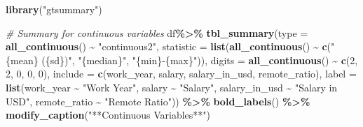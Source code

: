 \documentclass[
]{article}
\newenvironment{Shaded}{\begin{snugshade}}{\end{snugshade}}
\newcommand{\AttributeTok}[1]{\textcolor[rgb]{0.13,0.29,0.53}{#1}}
\newcommand{\CommentTok}[1]{\textcolor[rgb]{0.56,0.35,0.01}{\textit{#1}}}
\newcommand{\DecValTok}[1]{\textcolor[rgb]{0.00,0.00,0.81}{#1}}
\newcommand{\FunctionTok}[1]{\textcolor[rgb]{0.13,0.29,0.53}{\textbf{#1}}}
\newcommand{\NormalTok}[1]{#1}
\newcommand{\SpecialCharTok}[1]{\textcolor[rgb]{0.81,0.36,0.00}{\textbf{#1}}}
\newcommand{\StringTok}[1]{\textcolor[rgb]{0.31,0.60,0.02}{#1}}
\begin{document}
\begin{Shaded}
\begin{Highlighting}[]
\FunctionTok{library}\NormalTok{(}\StringTok{"gtsummary"}\NormalTok{)}

\CommentTok{\# Summary for continuous variables}
\NormalTok{df}\SpecialCharTok{\%\textgreater{}\%} 
  \FunctionTok{tbl\_summary}\NormalTok{(}\AttributeTok{type =} \FunctionTok{all\_continuous}\NormalTok{() }\SpecialCharTok{\textasciitilde{}} \StringTok{"continuous2"}\NormalTok{, }\AttributeTok{statistic =} \FunctionTok{list}\NormalTok{(}\FunctionTok{all\_continuous}\NormalTok{() }\SpecialCharTok{\textasciitilde{}} \FunctionTok{c}\NormalTok{(}\StringTok{"\{mean\} (\{sd\})"}\NormalTok{, }\StringTok{"\{median\}"}\NormalTok{, }\StringTok{"\{min\}{-}\{max\}"}\NormalTok{)),}
  \AttributeTok{digits =} \FunctionTok{all\_continuous}\NormalTok{() }\SpecialCharTok{\textasciitilde{}} \FunctionTok{c}\NormalTok{(}\DecValTok{2}\NormalTok{, }\DecValTok{2}\NormalTok{, }\DecValTok{0}\NormalTok{, }\DecValTok{0}\NormalTok{, }\DecValTok{0}\NormalTok{), }\AttributeTok{include =} \FunctionTok{c}\NormalTok{(work\_year, salary, salary\_in\_usd, remote\_ratio),}
  \AttributeTok{label =} \FunctionTok{list}\NormalTok{(work\_year }\SpecialCharTok{\textasciitilde{}} \StringTok{"Work Year"}\NormalTok{, salary }\SpecialCharTok{\textasciitilde{}} \StringTok{"Salary"}\NormalTok{, salary\_in\_usd }\SpecialCharTok{\textasciitilde{}} \StringTok{"Salary in USD"}\NormalTok{, remote\_ratio }\SpecialCharTok{\textasciitilde{}} \StringTok{"Remote Ratio"}\NormalTok{)) }\SpecialCharTok{\%\textgreater{}\%}
  \FunctionTok{bold\_labels}\NormalTok{() }\SpecialCharTok{\%\textgreater{}\%}
  \FunctionTok{modify\_caption}\NormalTok{(}\StringTok{"**Continuous Variables**"}\NormalTok{)}
\end{Highlighting}
\end{Shaded}
\end{document}
